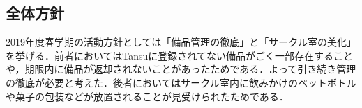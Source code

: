 \subsection*{全体方針}
 2019年度春学期の活動方針としては「備品管理の徹底」と「サークル室の美化」を挙げる．前者においてはTansuに登録されてない備品がごく一部存在することや，期限内に備品が返却されないことがあったためである．よって引き続き管理の徹底が必要と考えた．後者においてはサークル室内に飲みかけのペットボトルや菓子の包装などが放置されることが見受けられたためである．

